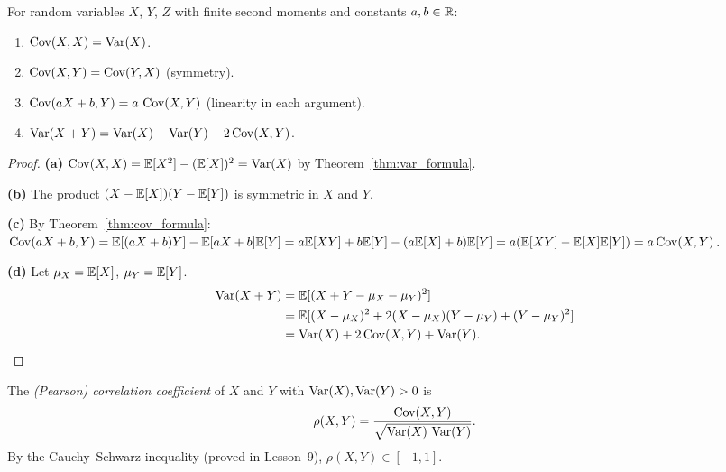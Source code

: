 \documentclass[11pt,a4paper]{article}
\begin{document}
\begin{proposition}
\label{prop:cov_props}
For random variables $X$, $Y$, $Z$ with finite second moments
and constants $a, b \in \mathbb{R}$:
\begin{enumerate}[nosep,label=(\alph*)]
  \item $\operatorname{Cov}(X, X) = \operatorname{Var}(X)$.
  \item $\operatorname{Cov}(X, Y) = \operatorname{Cov}(Y, X)$ (symmetry).
  \item $\operatorname{Cov}(aX + b, Y) = a\,\operatorname{Cov}(X, Y)$ (linearity in each
    argument).
  \item $\operatorname{Var}(X + Y) = \operatorname{Var}(X) + \operatorname{Var}(Y) + 2\operatorname{Cov}(X, Y)$.
\end{enumerate}
\end{proposition}

\begin{proof}
\textbf{(a)} $\operatorname{Cov}(X, X) = \mathbb{E}[X^2] - (\mathbb{E}[X])^2 = \operatorname{Var}(X)$
by Theorem~\ref{thm:var_formula}.

\textbf{(b)} The product $(X - \mathbb{E}[X])(Y - \mathbb{E}[Y])$ is symmetric
in $X$ and $Y$.

\textbf{(c)} By Theorem~\ref{thm:cov_formula}:
$\operatorname{Cov}(aX + b, Y) = \mathbb{E}[(aX + b)Y] - \mathbb{E}[aX + b]\mathbb{E}[Y]
= a\mathbb{E}[XY] + b\mathbb{E}[Y] - (a\mathbb{E}[X] + b)\mathbb{E}[Y]
= a(\mathbb{E}[XY] - \mathbb{E}[X]\mathbb{E}[Y]) = a\operatorname{Cov}(X, Y)$.

\textbf{(d)} Let $\mu_X = \mathbb{E}[X]$, $\mu_Y = \mathbb{E}[Y]$.
\begin{align}
  \operatorname{Var}(X + Y) &= \mathbb{E}[(X + Y - \mu_X - \mu_Y)^2]
  \nonumber\\
  &= \mathbb{E}[(X - \mu_X)^2 + 2(X - \mu_X)(Y - \mu_Y)
    + (Y - \mu_Y)^2]
  \nonumber\\
  &= \operatorname{Var}(X) + 2\operatorname{Cov}(X, Y) + \operatorname{Var}(Y). \qedhere
\end{align}
\end{proof}

\begin{definition}
\label{def:correlation}
The \emph{(Pearson) correlation coefficient} of $X$ and $Y$
with $\operatorname{Var}(X), \operatorname{Var}(Y) > 0$ is
\begin{equation}
  \rho(X, Y) = \frac{\operatorname{Cov}(X, Y)}
    {\sqrt{\operatorname{Var}(X)\,\operatorname{Var}(Y)}}.
  \label{eq:correlation}
\end{equation}
By the Cauchy--Schwarz inequality (proved in Lesson~9),
$\rho(X, Y) \in [-1, 1]$.
\end{definition}

\end{document}
